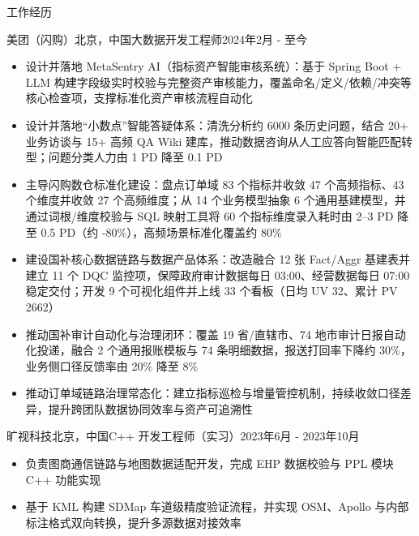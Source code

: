 \documentclass{resume} %
\begin{document}
\begin{rSection}{工作经历}

\begin{rSubsection}{美团（闪购）}{北京，中国}{\textup{大数据开发工程师}}{\textup{2024年2月 - 至今}}
\begin{itemize}
\setlength\itemsep{-0.2em}
\item 设计并落地 MetaSentry AI（指标资产智能审核系统）：基于 Spring Boot + LLM 构建字段级实时校验与完整资产审核能力，覆盖命名/定义/依赖/冲突等核心检查项，支撑标准化资产审核流程自动化
\item 设计并落地“小数点”智能答疑体系：清洗分析约 6000 条历史问题，结合 20+ 业务访谈与 15+ 高频 QA Wiki 建库，推动数据咨询从人工应答向智能匹配转型；问题分类人力由 1 PD 降至 0.1 PD
\item 主导闪购数仓标准化建设：盘点订单域 83 个指标并收敛 47 个高频指标、43 个维度并收敛 27 个高频维度；从 14 个业务模型抽象 6 个通用基建模型，并通过词根/维度校验与 SQL 映射工具将 60 个指标维度录入耗时由 2--3 PD 降至 0.5 PD（约 -80\%），高频场景标准化覆盖约 80\%
\item 建设国补核心数据链路与数据产品体系：改造融合 12 张 Fact/Aggr 基建表并建立 11 个 DQC 监控项，保障政府审计数据每日 03:00、经营数据每日 07:00 稳定交付；开发 9 个可视化组件并上线 33 个看板（日均 UV 32、累计 PV 2662）
\item 推动国补审计自动化与治理闭环：覆盖 19 省/直辖市、74 地市审计日报自动化投递，融合 2 个通用报账模板与 74 条明细数据，报送打回率下降约 30\%，业务侧口径反馈率由 20\% 降至 8\%
\item 推动订单域链路治理常态化：建立指标巡检与增量管控机制，持续收敛口径差异，提升跨团队数据协同效率与资产可追溯性
\end{itemize}
\end{rSubsection}

\begin{rSubsection}{旷视科技}{北京，中国}{\textup{C++ 开发工程师（实习）}}{\textup{2023年6月 - 2023年10月}}
\begin{itemize}
\setlength\itemsep{-0.2em}
\item 负责图商通信链路与地图数据适配开发，完成 EHP 数据校验与 PPL 模块 C++ 功能实现
\item 基于 KML 构建 SDMap 车道级精度验证流程，并实现 OSM、Apollo 与内部标注格式双向转换，提升多源数据对接效率
\end{itemize}
\end{rSubsection}

\end{rSection}
\end{document}

